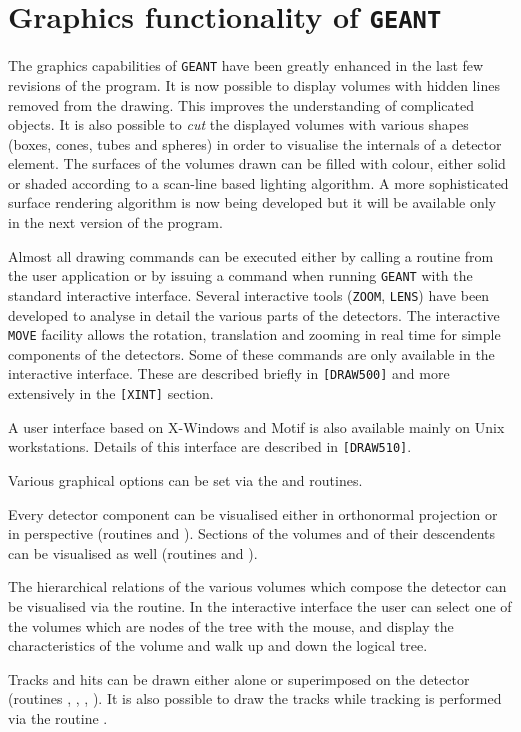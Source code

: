 \section{Graphics functionality of {\tt GEANT}}
The graphics capabilities of {\tt GEANT} have been greatly enhanced in 
the last few revisions of the program. It is now possible to display 
volumes with
hidden lines removed from the drawing. This improves the understanding of
complicated objects. It is also possible to {\it cut} the displayed volumes
with various shapes (boxes, cones, tubes and spheres) in order
to visualise the internals of a detector element.
The surfaces of the volumes drawn can be filled with
colour, either solid or shaded according to a scan-line based
lighting algorithm. 
A more sophisticated surface rendering algorithm is now being developed
but it will be available only in the next version of the program.

Almost all drawing commands can be executed either by
calling a routine from the
user application or by
issuing a command when running {\tt GEANT} with the
standard interactive interface. 
Several interactive
tools ({\tt ZOOM}, {\tt LENS}) have been developed to analyse in detail 
the various parts of the detectors.
The interactive {\tt MOVE} facility allows the rotation, 
translation and zooming
in real time for simple components of the detectors.
Some of these commands are only available in the
interactive interface. These are described briefly in {\tt [DRAW500]} and
more extensively in the {\tt [XINT]} section.

A user interface based on X-Windows and Motif is also available
mainly on Unix workstations. Details of this interface are described
in {\tt [DRAW510]}.

Various graphical options can be set via the  and  
routines.

Every detector component can be visualised either in orthonormal projection
or in perspective (routines  and ). Sections of the 
volumes and of their descendents can be visualised as well (routines 
 and ). 

The hierarchical relations of the various volumes which compose the
detector can be visualised via the  routine. In the 
interactive interface the user can select one of the volumes which
are nodes of the tree with the mouse,
and display the characteristics of the volume and walk up and down
the logical tree.

Tracks and hits can be drawn either alone or superimposed on the detector
(routines , , , ). It is also possible to 
draw the tracks while tracking is performed via the routine . 

